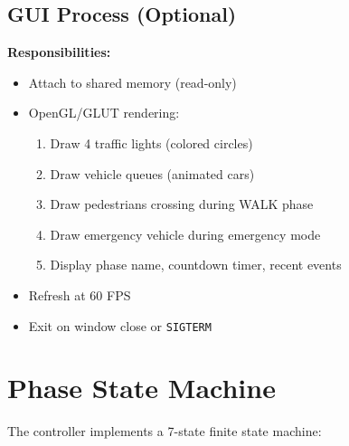 \documentclass[11pt,a4paper]{article}
\begin{document}
\subsection{GUI Process (Optional)}
\textbf{Responsibilities:}
\begin{itemize}[noitemsep]
    \item Attach to shared memory (read-only)
    \item OpenGL/GLUT rendering:
    \begin{enumerate}[noitemsep]
        \item Draw 4 traffic lights (colored circles)
        \item Draw vehicle queues (animated cars)
        \item Draw pedestrians crossing during WALK phase
        \item Draw emergency vehicle during emergency mode
        \item Display phase name, countdown timer, recent events
    \end{enumerate}
    \item Refresh at 60 FPS
    \item Exit on window close or \texttt{SIGTERM}
\end{itemize}

\newpage
\section{Phase State Machine}

The controller implements a 7-state finite state machine:
\end{document}
